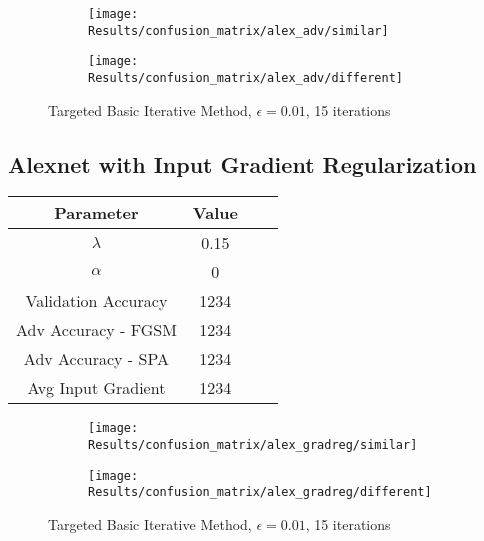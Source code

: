 \documentclass[draft,final]{vutinfth} %
\begin{document}
\begin{figure}[h]
  \begin{subfigure}[b]{0.5\columnwidth}
		\centering
    \texttt{[image: Results/confusion\_matrix/alex\_adv/similar]}%
    \label{fig:exp:cm:alex_adv:similar}
  \end{subfigure}
  \begin{subfigure}[b]{0.5\columnwidth}
		\centering
    \texttt{[image: Results/confusion\_matrix/alex\_adv/different]}
    \label{fig:exp:cm:alex_adv:different}
  \end{subfigure}
  \caption{Targeted Basic Iterative Method, $\epsilon = 0.01$, 15 iterations}
  \label{fig:intro} %
\end{figure}


\subsection{Alexnet with Input Gradient Regularization}

\begin{table}[h]
  \centering
  \begin{tabular}{cccc}
    \toprule
			Parameter			& Value   \\
    \midrule
			$\lambda$								& 0.15		\\
			$\alpha$								& 0				\\
			
			Validation Accuracy			& 1234		\\ %
			Adv Accuracy - FGSM			& 1234 		\\
			Adv Accuracy - SPA			& 1234		\\
			
			Avg Input Gradient			& 1234		\\
    \bottomrule
  \end{tabular}
\end{table}


\begin{figure}[h]
  \begin{subfigure}[b]{0.5\columnwidth}
		\centering
    \texttt{[image: Results/confusion\_matrix/alex\_gradreg/similar]}%
    \label{fig:exp:cm:alex_gradreg:similar}
  \end{subfigure}
  \begin{subfigure}[b]{0.5\columnwidth}
		\centering
    \texttt{[image: Results/confusion\_matrix/alex\_gradreg/different]}
    \label{fig:exp:cm:alex_gradreg:different}
  \end{subfigure}
  \caption{Targeted Basic Iterative Method, $\epsilon = 0.01$, 15 iterations}
  \label{fig:intro} %
\end{figure}
\end{document}
